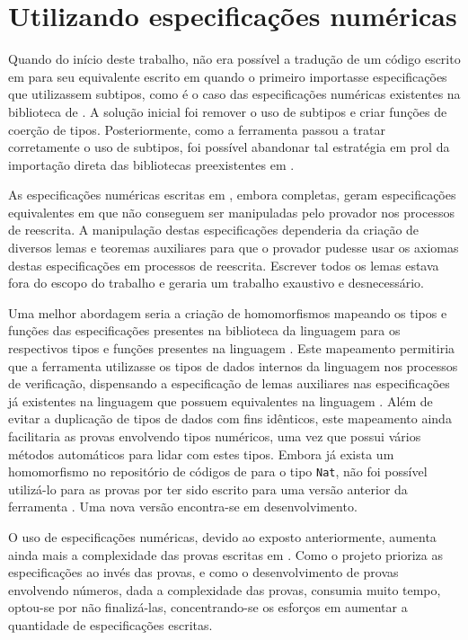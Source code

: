 \section{Utilizando especificações numéricas}
Quando do início deste trabalho, não era possível a tradução de um código escrito em \HasCASL para seu equivalente escrito em \HOL quando o primeiro importasse especificações que utilizassem subtipos, como é o caso das especificações numéricas existentes na biblioteca de \CASL.
A solução inicial foi remover o uso de subtipos e criar funções de coerção de tipos.
Posteriormente, como a ferramenta \Hets passou a tratar corretamente o uso de subtipos, foi possível abandonar tal estratégia em prol da importação direta das bibliotecas preexistentes em \CASL.

As especificações numéricas escritas em \CASL, embora completas, geram especificações equivalentes em \HOL que não conseguem ser manipuladas pelo provador \Isabelle nos processos de reescrita.
A manipulação destas especificações dependeria da criação de diversos lemas e teoremas auxiliares para que o provador \Isabelle pudesse usar os axiomas destas especificações em processos de reescrita.
Escrever todos os lemas estava fora do escopo do trabalho e geraria um trabalho exaustivo e desnecessário.

Uma melhor abordagem seria a criação de homomorfismos mapeando os tipos e funções das especificações presentes na biblioteca da linguagem \CASL para os respectivos tipos e funções presentes na linguagem \HOL.
Este mapeamento permitiria que a ferramenta \Isabelle utilizasse os tipos de dados internos da linguagem \HOL nos processos de verificação, dispensando a especificação de lemas auxiliares nas especificações já existentes na linguagem \CASL que possuem equivalentes na linguagem \HOL.
Além de evitar a duplicação de tipos de dados com fins idênticos, este mapeamento ainda facilitaria as provas envolvendo tipos numéricos, uma vez que \Isabelle possui vários métodos automáticos para lidar com estes tipos.
Embora já exista um homomorfismo no repositório de códigos de \CASL para o tipo \Verb.Nat., não foi possível utilizá-lo para as provas por ter sido escrito para uma versão anterior da ferramenta \HOL.
Uma nova versão encontra-se em desenvolvimento.

O uso de especificações numéricas, devido ao exposto anteriormente, aumenta ainda mais a complexidade das provas escritas em \HOL.
Como o projeto prioriza as especificações ao invés das provas, e como o desenvolvimento de provas envolvendo números, dada a complexidade das provas, consumia muito tempo, optou-se por não finalizá-las, concentrando-se os esforços em aumentar a quantidade de especificações escritas.

